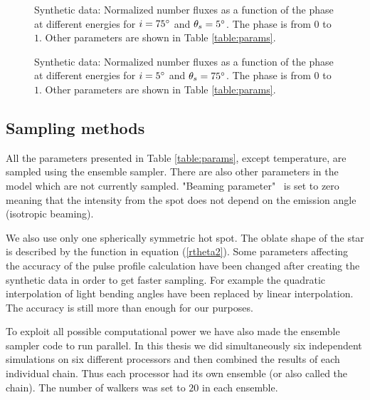 \documentclass{wihuri}
\def\thetas{\theta_{s}}
\begin{document}
%



\begin{figure}
\centerline{}
\caption{Synthetic data: Normalized number fluxes as a function of the phase at different energies for $i = 75 \degree$ and $\thetas = 5 \degree$. The phase is from $0$ to $1$. Other parameters are shown in Table \ref{table:params}.
\label{fig:syntpol2}}
\end{figure}


\begin{figure}
\centerline{}
\caption{Synthetic data: Normalized number fluxes as a function of the phase at different energies for $i = 5 \degree$ and $\thetas = 75 \degree$. The phase is from $0$ to $1$. Other parameters are shown in Table \ref{table:params}.
\label{fig:synteq2}}
\end{figure}


\subsection{Sampling methods}

All the parameters presented in Table \ref{table:params}, except temperature, are sampled using the ensemble sampler. There are also other parameters in the model which are not currently sampled. %
"Beaming parameter" \ is set to zero meaning that the intensity from the spot does not depend on the emission angle (isotropic beaming). 

We also use only one spherically symmetric hot spot. The oblate shape of the star is described by the function in equation (\ref{rtheta2}). Some parameters affecting the accuracy of the pulse profile calculation have been changed after creating the synthetic data in order to get faster sampling. For example the quadratic interpolation of light bending angles have been replaced by linear interpolation. The accuracy is still more than enough for our purposes. 

To exploit all possible computational power we have also made the ensemble sampler code to run parallel. In this thesis we did simultaneously six independent simulations on six different processors and then combined the results of each individual chain. Thus each processor had its own ensemble (or also called the chain). The number of walkers was set to $20$ in each ensemble. 
 
\end{document}
